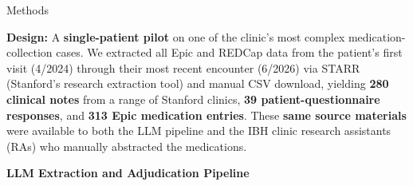 \documentclass[final]{beamer}
\newlength{\colwide}    %
\begin{document}
\begin{frame}[t]
\begin{columns}[t]
\begin{column}{\colwide}
  \vspace{-0.6em}
  \begin{block}{Methods}

    \textbf{Design:} A \textbf{single-patient pilot} on one of the clinic's most
    complex medication-collection cases. We extracted all Epic and REDCap data from the
    patient's first visit (4/2024) through their most recent encounter
    (6/2026) via STARR (Stanford's research extraction tool)
    and manual CSV download, yielding \textbf{280 clinical notes} from a range
    of Stanford clinics, \textbf{39 patient-questionnaire responses}, and
    \textbf{313 Epic medication entries}. These \textbf{same source materials}
    were available to both the LLM pipeline and the IBH clinic research assistants
    (RAs) who manually abstracted the medications.

    \vspace{0.2em}
    \begin{center}
    \textbf{LLM Extraction and Adjudication Pipeline}


\end{center}
\end{block}
\end{column}
\end{columns}
\end{frame}
\end{document}
